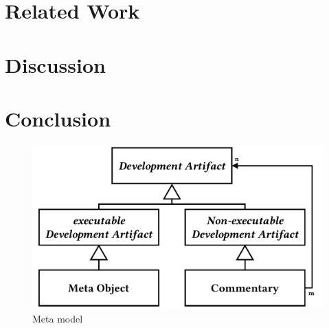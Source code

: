 \section{Related Work}

\section{Discussion}

\section{Conclusion}

\begin{figure}
\includegraphics[page=1, width=\columnwidth]{images/metamodel}
\caption{Meta model}
\end{figure}
